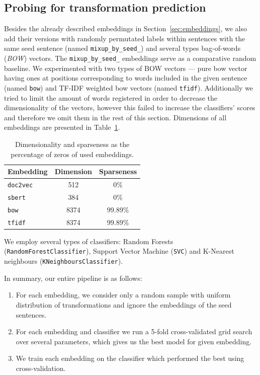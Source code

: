 \documentclass[11pt]{article}
\newcommand{\Embed}[1]{\texttt{#1}}
\newcommand{\Cls}[1]{\texttt{#1}}
\begin{document}

\subsection{Probing for transformation prediction}\label{sec:probing_results}

Besides the already described embeddings in Section~\ref{sec:embeddings}, we
also add their versions with randomly permutated labels within sentences with
the same seed sentence (named \Embed{mixup\_by\_seed\_}) and several types
bag-of-words (\emph{BOW}) vectors. The \Embed{mixup\_by\_seed\_} embeddings
serve as a comparative random baseline. We experimented with two types of BOW
vectors --- pure bow vector having ones at positions corresponding to words
included in the given sentence (named \Embed{bow}) and TF-IDF weighted bow
vectors (named \Embed{tfidf}). Additionally we tried to limit the amount of
words registered in order to decrease the dimensionality of the vectors,
however this failed to increase the classifiers' scores and therefore we omit
them in the rest of this section. Dimensions of all embeddings are presented in
Table~\ref{tab:embeddings_dim}.


\begin{table}[htp]
  \centering
  \begin{tabular}{l  c c}
    \toprule
    Embedding & Dimension & Sparseness\\
    \midrule
    \Embed{doc2vec} & 512 & 0\%\\
    \Embed{sbert} & 384 & 0\%\\
    \Embed{bow} & 8374 & 99.89\%\\
    \Embed{tfidf} & 8374 & 99.89\%\\
    \bottomrule
  \end{tabular}
  \caption{Dimensionality and sparseness as the percentage of zeros of used
  embeddings.}\label{tab:embeddings_dim}
\end{table}

We employ several types of classifiers: Random Forests
(\Cls{RandomForestClassifier}), Support Vector Machine (\Cls{SVC}) and
K-Nearest neighbours (\Cls{KNeighboursClassifier}).


In summary, our entire pipeline is as follows:
\begin{enumerate}
  \item For each embedding, we consider only a random sample with uniform
    distribution of transformations and ignore the embeddings of the seed
    sentences.
  \item For each embedding and classifier we run a 5-fold cross-validated grid
    search over several parameters, which gives us the best model for given
    embedding.
  \item We train each embedding on the classifier which performed the best
    using cross-validation.
\end{enumerate}
\end{document}
